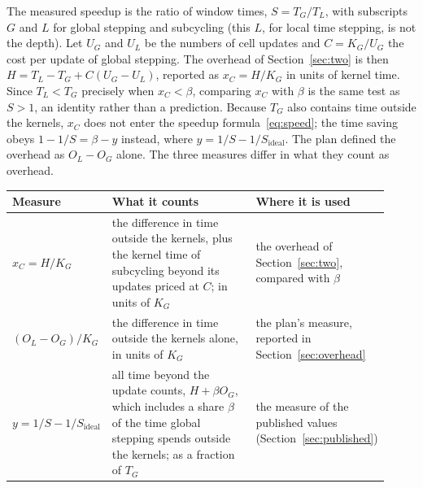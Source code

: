 \documentclass[12pt]{article}
\theoremstyle{remark}
\newcommand{\Sid}{S_{\mathrm{ideal}}}
\begin{document}
The measured speedup is the ratio of window times, $S=T_G/T_L$, with subscripts $G$ and $L$ for global stepping and subcycling (this $L$, for local time stepping, is not the depth). Let $U_G$ and $U_L$ be the numbers of cell updates and $C=K_G/U_G$ the cost per update of global stepping. The overhead of Section~\ref{sec:two} is then $H=T_L-T_G+C(U_G-U_L)$, reported as $x_C=H/K_G$ in units of kernel time. Since $T_L<T_G$ precisely when $x_C<\beta$, comparing $x_C$ with $\beta$ is the same test as $S>1$, an identity rather than a prediction. Because $T_G$ also contains time outside the kernels, $x_C$ does not enter the speedup formula~\eqref{eq:speed}; the time saving obeys $1-1/S=\beta-y$ instead, where $y=1/S-1/\Sid$. The plan defined the overhead as $O_L-O_G$ alone. The three measures differ in what they count as overhead.
\begin{center}
\small
\begin{tabular}{@{}>{\raggedright\arraybackslash}p{0.17\linewidth}>{\raggedright\arraybackslash}p{0.47\linewidth}>{\raggedright\arraybackslash}p{0.28\linewidth}@{}}
\toprule
Measure & What it counts & Where it is used\\
\midrule
$x_C=H/K_G$ & the difference in time outside the kernels, plus the kernel time of subcycling beyond its updates priced at $C$; in units of $K_G$ & the overhead of Section~\ref{sec:two}, compared with $\beta$\\
$(O_L-O_G)/K_G$ & the difference in time outside the kernels alone, in units of $K_G$ & the plan's measure, reported in Section~\ref{sec:overhead}\\
$y=1/S-1/\Sid$ & all time beyond the update counts, $H+\beta O_G$, which includes a share $\beta$ of the time global stepping spends outside the kernels; as a fraction of $T_G$ & the measure of the published values (Section~\ref{sec:published})\\
\bottomrule
\end{tabular}
\end{center}
\end{document}

